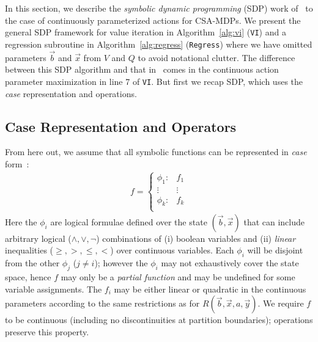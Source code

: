 \label{sec:sdp}

In this section, we describe the \emph{symbolic dynamic programming}
(SDP) work of~\cite{sanner_aaai12} to the case of continuously
parameterized actions for CSA-MDPs.  We present the general SDP
framework for value iteration in Algorithm~\ref{alg:vi} (\texttt{VI})
and a regression subroutine in Algorithm~\ref{alg:regress}
(\texttt{Regress}) where we have omitted parameters $\vec{b}$ and
$\vec{x}$ from $V$ and $Q$ to avoid notational clutter.  The
difference between this SDP algorithm and that in~\cite{sanner_uai11}
comes in the continuous action parameter maximization in line 7 of
\texttt{VI}.
But first we recap SDP,
which uses the \emph{case} representation and operations.

\subsection{Case Representation and Operators}

From here out, we assume that all symbolic functions
can be represented in \emph{case} form~\cite{fomdp}:
{%
\begin{align}
f = 
\begin{cases}
  \phi_1: & f_1 \\ 
 \vdots&\vdots\\ 
  \phi_k: & f_k \\ 
\end{cases} \label{eq:case}
\end{align}
}
Here the $\phi_i$ are logical formulae defined over the state
$(\vec{b},\vec{x})$ that can include arbitrary logical ($\land,\lor,\neg$)
combinations of (i) boolean variables and (ii) 
\emph{linear} inequalities ($\geq,>,\leq,<$) 
over continuous variables.  
Each $\phi_i$ will be disjoint from the other $\phi_j$ ($j \neq i$); 
however the $\phi_i$ may not exhaustively cover the state space, hence
$f$ may only be a \emph{partial function} and may be undefined for some
variable assignments.
The $f_i$ may be either linear or quadratic in the continuous parameters
according to the same restrictions as for 
$R(\vec{b},\vec{x},a,\vec{y})$.  
We require $f$ to be continuous 
(including no discontinuities at partition boundaries); 
operations preserve this property.


